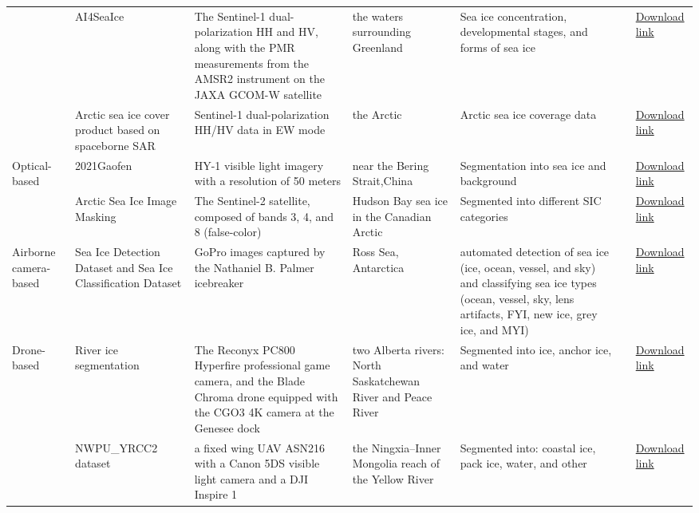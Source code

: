 \begin{table*}[htbp]
\begin{center}
{\begin{tabular}{p{1.5cm}p{3.5cm}p{3cm}p{2.3cm}p{5.5cm}p{0.7cm}p{2cm}}
&AI4SeaIce	&The Sentinel-1 dual-polarization HH and HV, along with the PMR measurements from the AMSR2 instrument on the JAXA GCOM-W satellite	&the waters surrounding Greenland	&Sea ice concentration, developmental stages, and forms of sea ice	&\cite{96stokholm2022ai4seaice}
&\href{https://data.dtu.dk/articles/dataset/AI4Arctic\_ASIP\_Sea\_Ice\_Dataset\_-\_version\_2/13011134/2}{Download link}\\

&Arctic sea ice cover product based on spaceborne SAR	&Sentinel-1 dual-polarization HH/HV data in EW mode	&the Arctic	&Arctic sea ice coverage data	&\cite{95wang2021arctic}
&\href{https://www.scidb.cn/en/detail?dataSetId=771301999089025024}{Download link}\\\hline

\multirow{2}{*}{Optical-based}	&2021Gaofen	&HY-1 visible light imagery with a resolution of 50 meters	&near the Bering Strait,China	&Segmentation into sea ice and background	&\cite{121kang2022decoding}
&\href{https://www.gaofen-challenge.com/challenge/competition/2}{Download link}\\

&Arctic Sea Ice Image Masking	&The Sentinel-2 satellite, composed of bands 3, 4, and 8 (false-color)	&Hudson Bay sea ice in the Canadian Arctic	&Segmented into different SIC categories	& 	&\href{https://www.kaggle.com/datasets/alexandersylvester/arctic-sea-ice-image-masking}{Download link}\\ \hline

Airborne camera-based	&Sea Ice Detection Dataset and Sea Ice Classification Dataset	&GoPro images captured by the Nathaniel B. Palmer icebreaker	&Ross Sea, Antarctica	&automated detection of sea ice (ice, ocean, vessel, and sky) and classifying sea ice types (ocean, vessel, sky, lens artifacts, FYI, new ice, grey ice, and MYI)	&\cite{133zhang2021icenetv2}
&\href{https://youtu.be/BNZu1uxNvlo}{Download link}\\ \hline

\multirow{2}{*}{Drone-based}   &River ice segmentation	&The Reconyx PC800 Hyperfire professional game camera, and the Blade Chroma drone equipped with the CGO3 4K camera at the Genesee dock	&two Alberta rivers: North Saskatchewan River and Peace River	&Segmented into ice, anchor ice, and water	&\cite{145singh2020river}
&\href{https://ieee-dataport.org/open-access/alberta-river-ice-segmentation-dataset}{Download link}\\


&NWPU\_YRCC2 dataset	&a fixed wing UAV ASN216 with a Canon 5DS visible light camera and a DJI Inspire 1	&the Ningxia–Inner Mongolia reach of the Yellow River	&Segmented into: coastal ice, pack ice, water, and other	&\cite{132zhang2020icenet}
&\href{https://github.com/nwpulab113/NWPUYRCC2}{Download link}\\ \hline
\end{tabular}}
        
    \end{center}
\end{table*}


